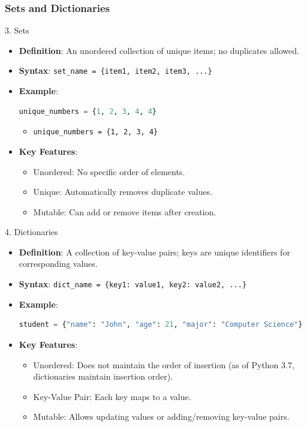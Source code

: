 \documentclass{beamer}
\begin{document}
\begin{frame}[fragile]
    \frametitle{Sets and Dictionaries}
    \begin{block}{3. Sets}
        \begin{itemize}
            \item \textbf{Definition}: An unordered collection of unique items; no duplicates allowed.
            \item \textbf{Syntax}: \texttt{set\_name = \{item1, item2, item3, ...\}}
            \item \textbf{Example}:
            \begin{lstlisting}[language=Python]
unique_numbers = {1, 2, 3, 4, 4}
            \end{lstlisting}
            \begin{itemize}
                \item\texttt{unique\_numbers = \{1, 2, 3, 4\}}
            \end{itemize}
            \item \textbf{Key Features}:
            \begin{itemize}
                \item Unordered: No specific order of elements.
                \item Unique: Automatically removes duplicate values.
                \item Mutable: Can add or remove items after creation.
            \end{itemize}
        \end{itemize}
    \end{block}
    
    \begin{block}{4. Dictionaries}
        \begin{itemize}
            \item \textbf{Definition}: A collection of key-value pairs; keys are unique identifiers for corresponding values.
            \item \textbf{Syntax}: \texttt{dict\_name = \{key1: value1, key2: value2, ...\}}
            \item \textbf{Example}:
            \begin{lstlisting}[language=Python]
student = {"name": "John", "age": 21, "major": "Computer Science"}
            \end{lstlisting}
            \item \textbf{Key Features}:
            \begin{itemize}
                \item Unordered: Does not maintain the order of insertion (as of Python 3.7, dictionaries maintain insertion order).
                \item Key-Value Pair: Each key maps to a value.
                \item Mutable: Allows updating values or adding/removing key-value pairs.
            \end{itemize}
        \end{itemize}
    \end{block}
\end{frame}
\end{document}
